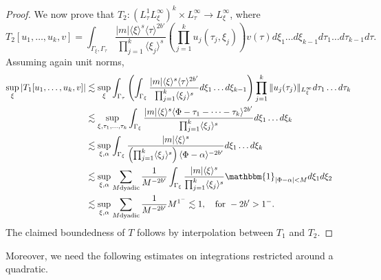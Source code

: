 \documentclass[a4paper, 11pt]{amsart}
\newcommand{\jap}[1]{\langle #1 \rangle}
\theoremstyle{plain}
\theoremstyle{definition}
\theoremstyle{remark}
\newcommand{\5}{\text{V}}
\numberwithin{equation}{section}
\theoremstyle{mytheoremstyle} \newtheorem{nota}[thm]{Remark}
\theoremstyle{mytheoremstyle} \newtheorem{exemplo}[thm]{Example}
\begin{document}
\begin{proof}
We now prove that $T_2:(L^1_\tau L^\infty_\xi)^k\times  L^\infty_\tau \to L^\infty_\xi$, where
$$
T_2[u_1,\dots, u_k,v]=\int_{\Gamma_\xi, \Gamma_\tau} \frac{|m|\jap{\xi}^s\jap{\tau}^{2b'}}{\prod_{j=1}^k\jap{\xi_j}^s}\left(\prod_{j=1}^ku_j(\tau_j,\xi_j)\right)v(\tau)d\xi_1\dots d\xi_{k-1}d\tau_1\dots d\tau_{k-1}d\tau.
$$
Assuming again unit norms,
	\begin{align*}
		\sup_\xi |T_1[u_1,\dots, u_k,v]|& \lesssim \sup_\xi \int_{\Gamma_\tau} \left(\int_{\Gamma_\xi} \frac{|m|\jap{\xi}^s\jap{\tau}^{2b'}}{\prod_{j=1}^k\jap{\xi_j}^s} d\xi_1\dots d\xi_{k-1} \right) \prod_{j=1}^k \|u_j(\tau_j)\|_{L^\infty_\xi} d\tau_1\dots d\tau_{k} \\&\lesssim \sup_{\xi, \tau_1, \dots, \tau_k} \int_{\Gamma_\xi} \frac{|m|\jap{\xi}^s\jap{\Phi-\tau_1-\dots-\tau_k}^{2b'}}{\prod_{j=1}^k\jap{\xi_j}^s} d\xi_1 \dots d\xi_k  \\&\lesssim \sup_{\xi,\alpha} \int_{\Gamma_\xi} \frac{|m|\jap{\xi}^s}{\left(\prod_{j=1}^k\jap{\xi_j}^s\right)\jap{\Phi-\alpha}^{-2b'}} d\xi_1 \dots d\xi_k\\&\lesssim \sup_{\xi,\alpha} \sum_{M \text{dyadic}} \frac{1}{M^{-2b'}}\int_{\Gamma_\xi} \frac{|m|\jap{\xi}^s}{\prod_{j=1}^k\jap{\xi_j}^s}\mathbbm{1}_{|\Phi-\alpha|<M} d\xi_1d\xi_2 \\&\lesssim \sup_{\xi,\alpha} \sum_{M \text{dyadic}} \frac{1}{M^{-2b'}}M^{1^-} \lesssim 1,\quad \mbox{for }-2b'>1^-.
	\end{align*}
The claimed boundedness of $T$ follows by interpolation between $T_1$ and $T_2$.
\end{proof}


Moreover, we need the following estimates on integrations restricted around a quadratic.
\end{document}
